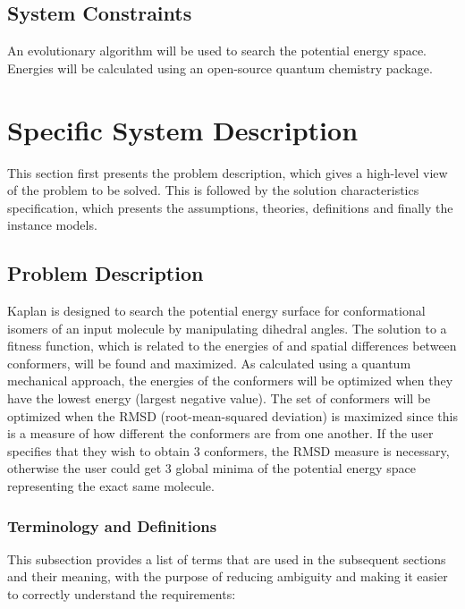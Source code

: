 \documentclass[12pt]{article}
\newcommand{\progname}{Kaplan} %
\begin{document}

\subsection{System Constraints}

An evolutionary algorithm will be used to search the potential energy space. 
Energies will be calculated using an open-source quantum chemistry package.

\section{Specific System Description} \label{section-system-desc}

This section first presents the problem description, which gives a high-level
view of the problem to be solved.  This is followed by the solution 
characteristics
specification, which presents the assumptions, theories, definitions and finally
the instance models.  

\subsection{Problem Description} \label{Sec_pd}

\progname{} is designed to search the potential energy surface for 
conformational isomers of an input molecule by manipulating dihedral angles. 
The solution to a fitness function, which is related to the energies of and 
spatial differences between conformers, will be found and maximized. As 
calculated using a quantum mechanical approach, the energies of the conformers 
will be optimized when they have the lowest energy (largest negative value). 
The set of conformers will be optimized when the RMSD (root-mean-squared 
deviation) is maximized since this is a measure of how different the conformers 
are from one another. If the user specifies that they wish to obtain 3 
conformers, the RMSD measure is necessary, otherwise the user could get 3 
global minima of the potential energy space representing the exact same 
molecule. 

\subsubsection{Terminology and Definitions}

This subsection provides a list of terms that are used in the subsequent
sections and their meaning, with the purpose of reducing ambiguity and making it
easier to correctly understand the requirements:
\end{document}
